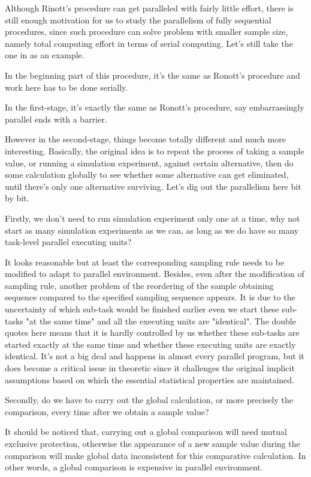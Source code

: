 \documentclass[12pt,a4paper]{report}
\begin{document}
Although Rinott's procedure can get paralleled with fairly little effort, there is still enough motivation for us to study the parallelism of fully sequential procedures, since such procedure can solve problem with smaller sample size, namely total computing effort in terms of serial computing. Let's still take the one in \cite{ras-seq-jeff} as an example.

In the beginning part of this procedure, it's the same as Ronott's procedure and work here has to be done serially.

In the first-stage, it's exactly the same as Ronott's procedure, say embarrassingly parallel ends with a barrier.

However in the second-stage, things become totally different and much more interesting. Basically, the original idea is to repeat the process of taking a sample value, or running a simulation experiment, against certain alternative, then do some calculation globally to see whether some alternative can get eliminated, until there's only one alternative surviving. Let's dig out the parallelism here bit by bit.

Firstly, we don't need to run simulation experiment only one at a time, why not start as many simulation experiments as we can, as long as we do have so many task-level parallel executing units?

It looks reasonable but at least the corresponding sampling rule needs to be modified to adapt to parallel environment. Besides, even after the modification of sampling rule, another problem of the reordering of the sample obtaining sequence compared to the specified sampling sequence appears. It is due to the uncertainty of which sub-task would be finished earlier even we start these sub-tasks "at the same time" and all the executing units are "identical". The double quotes here means that it is hardly controlled by us whether these sub-tasks are started exactly at the same time and whether these executing units are exactly identical. It's not a big deal and happens in almost every parallel program, but it does become a critical issue in theoretic since it challenges the original implicit assumptions based on which the essential statistical properties are maintained.

Secondly, do we have to carry out the global calculation, or more precisely the comparison, every time after we obtain a sample value?

It should be noticed that, carrying out a global comparison will need mutual exclusive protection, otherwise the appearance of a new sample value during the comparison will make global data inconsistent for this comparative calculation. In other words, a global comparison is expensive in parallel environment.
\end{document}
